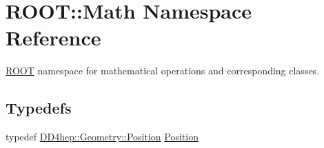 \hypertarget{namespace_r_o_o_t_1_1_math}{}\section{R\+O\+OT\+:\+:Math Namespace Reference}
\label{namespace_r_o_o_t_1_1_math}


\hyperlink{namespace_r_o_o_t}{R\+O\+OT} namespace for mathematical operations and corresponding classes.  


\subsection*{Typedefs}
\begin{DoxyCompactItemize}
\item 
typedef \hyperlink{namespace_d_d4hep_1_1_geometry_a55083902099d03506c6db01b80404900}{D\+D4hep\+::\+Geometry\+::\+Position} \hyperlink{namespace_r_o_o_t_1_1_math_ac2622efe8212cb8b8a8893efd5117de8}{Position}
\end{DoxyCompactItemize}
